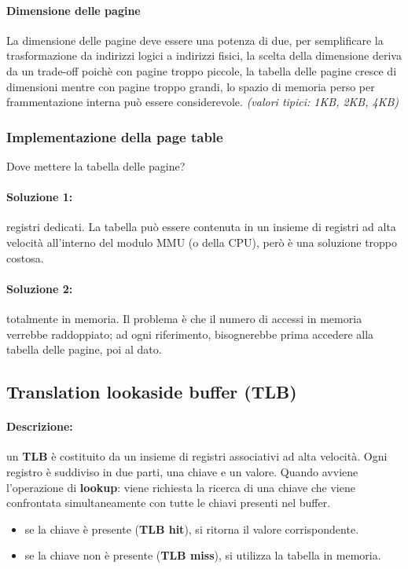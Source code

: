 \paragraph{Dimensione delle pagine}
La dimensione delle pagine deve essere una potenza di due, per
semplificare la trasformazione da indirizzi logici a indirizzi fisici, la scelta della dimensione deriva da un trade-off poichè con pagine troppo piccole, la tabella delle pagine cresce di
dimensioni mentre con pagine troppo grandi, lo spazio di memoria perso per frammentazione interna può essere considerevole.
\textit{(valori tipici: 1KB, 2KB, 4KB)}

\subsubsection{Implementazione della page table}
Dove mettere la tabella delle pagine?
\paragraph{Soluzione 1:} registri dedicati. La tabella può essere contenuta in un insieme di registri ad alta velocità all'interno del modulo MMU (o della CPU), però è una soluzione troppo costosa.

\paragraph{Soluzione 2:} totalmente in memoria. Il problema è che il numero di accessi in memoria verrebbe raddoppiato; ad
ogni riferimento, bisognerebbe prima accedere alla tabella delle
pagine, poi al dato.

\subsection{Translation lookaside buffer (TLB)}
\paragraph{Descrizione:} un \textbf{TLB} è costituito da un insieme di registri associativi ad alta velocità. Ogni registro è suddiviso in due parti, una chiave e un valore.
Quando avviene l'operazione di \textbf{lookup}: viene richiesta la ricerca di una chiave che viene confrontata simultaneamente con tutte le chiavi presenti nel buffer.
\begin{itemize}
    \item se la chiave è presente (\textbf{TLB hit}), si ritorna il valore
corrispondente.
    \item se la chiave non è presente (\textbf{TLB miss}), si utilizza la tabella in memoria.
\end{itemize}

